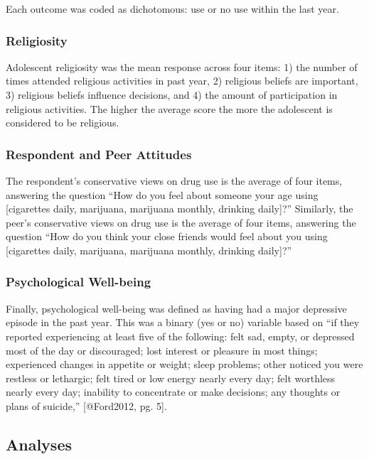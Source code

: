 \documentclass[]{article}
\begin{document}
\noindent Each outcome was coded as dichotomous: use or no use within
the last year.

\subsubsection{Religiosity}\label{religiosity}

Adolescent religiosity was the mean response across four items: 1) the
number of times attended religious activities in past year, 2) religious
beliefs are important, 3) religious beliefs influence decisions, and 4)
the amount of participation in religious activities. The higher the
average score the more the adolescent is considered to be religious.

\subsubsection{Respondent and Peer
Attitudes}\label{respondent-and-peer-attitudes}

The respondent's conservative views on drug use is the average of four
items, answering the question ``How do you feel about someone your age
using {[}cigarettes daily, marijuana, marijuana monthly, drinking
daily{]}?'' Similarly, the peer's conservative views on drug use is the
average of four items, answering the question ``How do you think your
close friends would feel about you using {[}cigarettes daily, marijuana,
marijuana monthly, drinking daily{]}?''

\subsubsection{Psychological Well-being}\label{psychological-well-being}

Finally, psychological well-being was defined as having had a major
depressive episode in the past year. This was a binary (yes or no)
variable based on ``if they reported experiencing at least five of the
following: felt sad, empty, or depressed most of the day or discouraged;
lost interest or pleasure in most things; experienced changes in
appetite or weight; sleep problems; other noticed you were restless or
lethargic; felt tired or low energy nearly every day; felt worthless
nearly every day; inability to concentrate or make decisions; any
thoughts or plans of suicide,'' {[}@Ford2012, pg. 5{]}.

\subsection{Analyses}\label{analyses}
\end{document}
